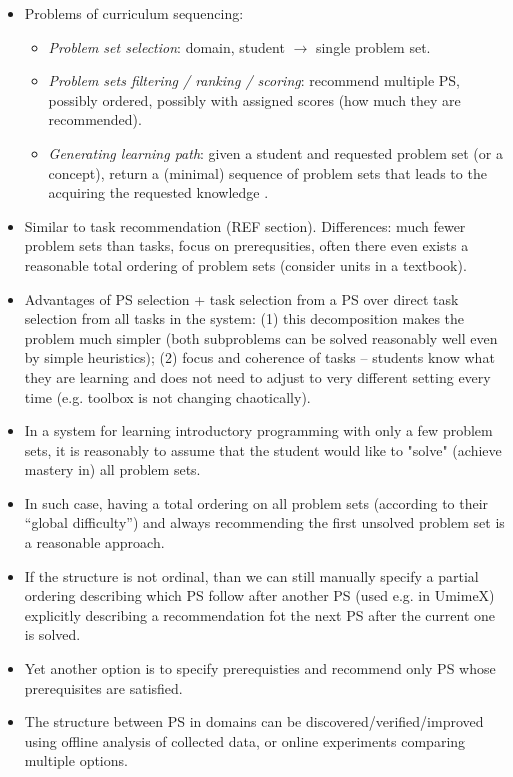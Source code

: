 \begin{itemize}
\item Problems of curriculum sequencing:
\begin{itemize}
\item \emph{Problem set selection}: domain, student $\rightarrow$ single problem set.
\item \emph{Problem sets filtering / ranking / scoring}:
  recommend multiple PS, possibly ordered, possibly with assigned scores (how
  much they are recommended).
\item \emph{Generating learning path}: given a student and requested problem set (or a concept),
  return a (minimal) sequence of problem sets that leads to the acquiring the
  requested knowledge \cite{its-programming}.
\end{itemize}

\item Similar to task recommendation (REF section). Differences:
  much fewer problem sets than tasks,
  focus on prerequsities,
  often there even exists a reasonable total ordering of problem sets
  (consider units in a textbook).
\item Advantages of PS selection + task selection from a PS over direct task selection from all tasks in the system:
  (1) this decomposition makes the problem much simpler (both subproblems can be solved reasonably well even by simple heuristics);
  (2) focus and coherence of tasks -- students know what they are learning and does not need to adjust to very different setting every time (e.g. toolbox is not changing chaotically).

\item In a system for learning introductory programming with only a few problem sets,
  it is reasonably to assume that the student would like to "solve" (achieve mastery in)
  all problem sets. %
\item In such case, having a total ordering on all problem sets (according to their
  ``global difficulty'') and always recommending the first unsolved problem set
  is a reasonable approach.
\item If the structure is not ordinal, than we can still manually specify a
partial ordering describing which PS follow after another PS (used e.g. in UmimeX)
explicitly describing a recommendation fot the next PS after the current one is solved.
\item Yet another option is to specify prerequisties and recommend only PS whose
  prerequisites are satisfied.
\item The structure between PS in domains can be discovered/verified/improved using
  offline analysis of collected data, or online experiments comparing multiple options.
\end{itemize}



